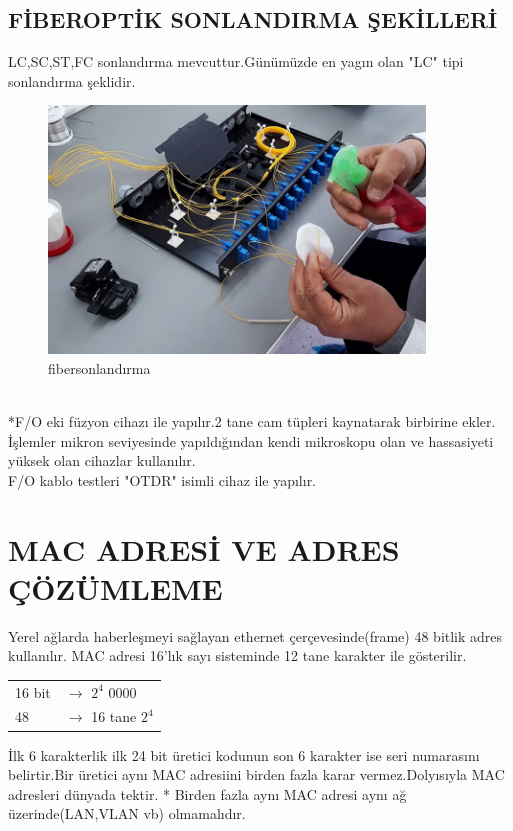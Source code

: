 \subsection*{FİBEROPTİK SONLANDIRMA ŞEKİLLERİ}
LC,SC,ST,FC sonlandırma mevcuttur.Günümüzde en yagın olan "LC" tipi sonlandırma şeklidir.\\
\begin{figure}[ht]
    \centering
    \includegraphics[width=10cm]{images/Fiber-Optik-Ek-ve-Sonlandirma}
    \caption{fibersonlandırma}
    \label{fig:fosonlandirma}
\end{figure}
\\
*F/O eki füzyon cihazı ile yapılır.2 tane cam tüpleri kaynatarak birbirine ekler.\\
İşlemler mikron seviyesinde yapıldığından kendi mikroskopu olan ve hassasiyeti yüksek olan cihazlar kullanılır. \\
F/O kablo testleri "OTDR" isimli cihaz  ile yapılır.
\section*{MAC ADRESİ VE ADRES ÇÖZÜMLEME}
Yerel ağlarda  haberleşmeyi sağlayan ethernet çerçevesinde(frame) 48 bitlik adres kullanılır.
MAC adresi 16'lık sayı sisteminde 12 tane karakter ile gösterilir.


\begin{table}[h]
    \centering
    \begin{tabular}{ll}
        16 bit & $\rightarrow$  $2^4$ 0000    \\
        48     & $\rightarrow$ 16 tane  $2^4$ \\
    \end{tabular}
\end{table}

İlk 6 karakterlik ilk 24 bit üretici kodunun son 6 karakter ise seri numarasını belirtir.Bir üretici aynı MAC adresiini birden fazla karar vermez.Dolyısıyla MAC adresleri dünyada tektir.
* Birden fazla aynı MAC adresi aynı ağ üzerinde(LAN,VLAN vb) olmamalıdır.

